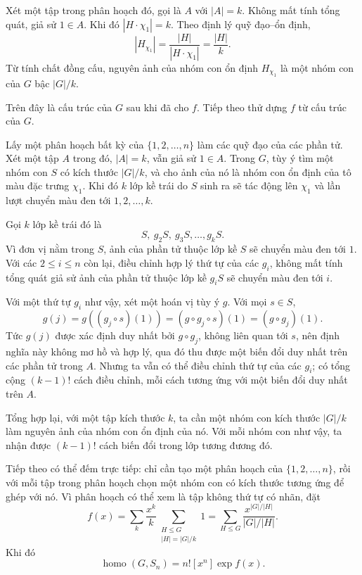 \documentclass[11pt]{article}
\begin{document}
Xét một tập trong phân hoạch đó, gọi là \(A\) với \(|A|=k\). Không mất tính
tổng quát, giả sử \(1\in A\). Khi đó \(|H\cdot\chi_1|=k\). Theo định lý quỹ
đạo--ổn định,
\[
  |H_{\chi_1}|=\frac{|H|}{|H\cdot\chi_1|}=\frac{|H|}{k}.
\]
Từ tính chất đồng cấu, nguyên ảnh của nhóm con ổn định \(H_{\chi_1}\) là một
nhóm con của \(G\) bậc \(|G|/k\).

Trên đây là cấu trúc của \(G\) sau khi đã cho \(f\). Tiếp theo thử dựng \(f\)
từ cấu trúc của \(G\).

Lấy một phân hoạch bất kỳ của \(\{1,2,\ldots,n\}\) làm các quỹ đạo của các phần
tử. Xét một tập \(A\) trong đó, \(|A|=k\), vẫn giả sử \(1\in A\). Trong \(G\),
tùy ý tìm một nhóm con \(S\) có kích thước \(|G|/k\), và cho ảnh của nó là nhóm
con ổn định của tô màu đặc trưng \(\chi_1\). Khi đó \(k\) lớp kề trái do \(S\)
sinh ra sẽ tác động lên \(\chi_1\) và lần lượt chuyển màu đen tới
\(1,2,\ldots,k\).

Gọi \(k\) lớp kề trái đó là
\[
  S,\ g_2S,\ g_3S,\ldots,g_kS.
\]
Vì đơn vị nằm trong \(S\), ảnh của phần tử thuộc lớp kề \(S\) sẽ chuyển màu đen
tới \(1\). Với các \(2\le i\le n\) còn lại, điều chỉnh hợp lý thứ tự của các
\(g_i\), không mất tính tổng quát giả sử ảnh của phần tử thuộc lớp kề \(g_iS\)
sẽ chuyển màu đen tới \(i\).

Với một thứ tự \(g_i\) như vậy, xét một hoán vị tùy ý \(g\). Với mọi \(s\in S\),
\[
  g(j)=g((g_j\circ s)(1))=(g\circ g_j\circ s)(1)=(g\circ g_j)(1).
\]
Tức \(g(j)\) được xác định duy nhất bởi \(g\circ g_j\), không liên quan tới
\(s\), nên định nghĩa này không mơ hồ và hợp lý, qua đó thu được một biến đổi
duy nhất trên các phần tử trong \(A\). Nhưng ta vẫn có thể điều chỉnh thứ tự
của các \(g_i\); có tổng cộng \((k-1)!\) cách điều chỉnh, mỗi cách tương ứng
với một biến đổi duy nhất trên \(A\).

Tổng hợp lại, với một tập kích thước \(k\), ta cần một nhóm con kích thước
\(|G|/k\) làm nguyên ảnh của nhóm con ổn định của nó. Với mỗi nhóm con như vậy,
ta nhận được \((k-1)!\) cách biến đổi trong lớp tương đương đó.

Tiếp theo có thể đếm trực tiếp: chỉ cần tạo một phân hoạch của
\(\{1,2,\ldots,n\}\), rồi với mỗi tập trong phân hoạch chọn một nhóm con có
kích thước tương ứng để ghép với nó. Vì phân hoạch có thể xem là tập không thứ
tự có nhãn, đặt
\[
  f(x)=
  \sum_k \frac{x^k}{k}
  \sum_{\substack{H\le G\\ |H|=|G|/k}}1
  =
  \sum_{H\le G}\frac{x^{|G|/|H|}}{|G|/|H|}.
\]
Khi đó
\[
  \operatorname{homo}(G,S_n)=n![x^n]\exp f(x).
\]
\end{document}
